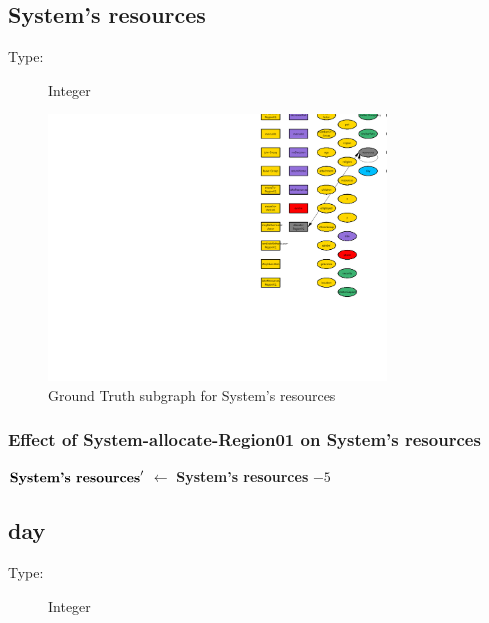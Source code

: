 \documentclass{article}%
\begin{document}
%
\subsection{System's resources}%
\label{subsec:System's resources}%
\begin{description}%
\item[Type:]%
Integer%
\end{description}%


\begin{figure}[ht]%
\centering%
\includegraphics[width=0.8\textwidth]{images/resourcesOfSystem.png}%
\caption{Ground Truth subgraph for System's resources}%
\end{figure}

%
\subsubsection{Effect of System{-}allocate{-}Region01 on System's resources}%
\label{ssubsec:Effect of System{-}allocate{-}Region01 on System's resources}%
\begin{flushleft}%
$\mbox{\textbf{System's resources}} '$%
$\leftarrow$%
\textbf{System's resources}%
${-}5$%
\end{flushleft}

%
\subsection{day}%
\label{subsec:day}%
\begin{description}%
\item[Type:]%
Integer%
\end{description}%
\end{document}
